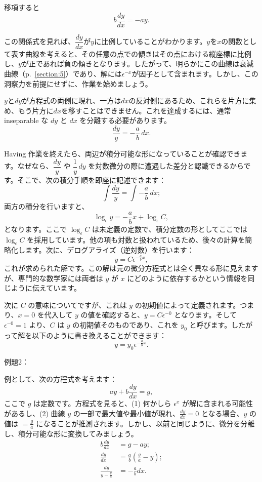 \documentclass[a4paper,11pt,openany]{ltjsbook}
\newcommand{\Pageref}[2][p.]{#1~\ref{#2}}
\begin{document}
移項すると
\[
b \frac{dy}{dx} = -ay.
\]

この関係式を見れば、$\dfrac{dy}{dx}$が$y$に比例していることがわかります。$y$を$x$の関数として表す曲線を考えると、その任意の点での傾きはその点における縦座標に比例し、$y$が正であれば負の傾きとなります。したがって、明らかにこの曲線は衰減曲線（\Pageref{section:5}）であり、解には$\epsilon^{-x}$が因子として含まれます。しかし、この洞察力を前提にせずに、作業を始めましょう。

$y$と$dy$が方程式の両側に現れ、一方は$dx$の反対側にあるため、これらを片方に集め、もう片方に$dx$を移すことはできません。これを達成するには、通常 inseparable な $dy$ と $dx$ を分離する必要があります。
\[
\frac{dy}{y} = - \frac{a}{b}\, dx.
\]

Having 作業を終えたら、両辺が積分可能な形になっていることが確認できます。なぜなら、$\dfrac{dy}{y}$ や $\dfrac{1}{y}\, dy$ を対数微分の際に遭遇した差分と認識できるからです。そこで、次の積分手順を即座に記述できます：
\[
\int \frac{dy}{y} = \int -\frac{a}{b}\, dx;
\]
両方の積分を行いますと、
\[
\log_\epsilon y = -\frac{a}{b} x + \log_\epsilon C,
\]
となります。ここで $\log_\epsilon C$ は未定義の定数で、積分定数の形としてここでは $\log_\epsilon C$ を採用しています。他の項も対数と扱われているため、後々の計算を簡略化します。次に、デログアライズ（逆対数）を行います：
\[
y = C \epsilon^{-\frac{a}{b} x},
\]
これが求められた解です。この解は元の微分方程式とは全く異なる形に見えますが、専門的な数学家には両者は $y$ が $x$ にどのように依存するかという情報を同じように伝えています。

次に $C$ の意味についてですが、これは $y$ の初期値によって定義されます。つまり、$x = 0$ を代入して $y$ の値を確認すると、$y = C \epsilon^{-0}$ となります。そして $\epsilon^{-0} = 1$ より、$C$ は $y$ の初期値そのものであり、これを $y_0$ と呼びます。したがって解を以下のように書き換えることができます：
\[
y = y_0 \epsilon^{-\frac{a}{b} x}.
\]

例題2：

例として、次の方程式を考えます：
\[
ay + b \frac{dy}{dx} = g,
\]
ここで $g$ は定数です。方程式を見ると、(1) 何かしら $\epsilon^x$ が解に含まれる可能性があるし、(2) 曲線 $y$ の一部で最大値や最小値が現れ、$\frac{dy}{dx} = 0$ となる場合、$y$ の値は $= \frac{g}{a}$ になることが推測されます。しかし、以前と同じように、微分を分離し、積分可能な形に変換してみましょう。
\begin{align*}
b\frac{dy}{dx} &= g - ay; \\
\frac{dy}{dx} &= \frac{a}{b}\left(\frac{g}{a} - y\right); \\
\frac{dy}{y - \frac{g}{a}} &= -\frac{a}{b} dx.
\end{align*}
\end{document}
